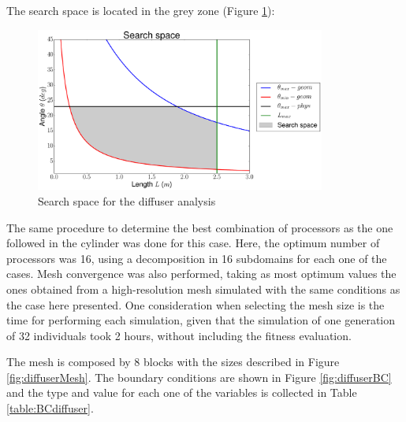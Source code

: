 The search space is located in the grey zone (Figure \ref{fig:searchSpace}):

     \begin{figure}[h!]
        \centering
        \includegraphics[width=0.85\textwidth]{Figures/3/SearchSpace.pdf}
        \caption{Search space for the diffuser analysis}
        \label{fig:searchSpace}
    \end{figure}

\newpage

The same procedure to determine the best combination of processors as the one followed in the cylinder was done for this case. Here, the optimum number of processors was 16, using a decomposition in 16 subdomains for each one of the cases. Mesh convergence was also performed, taking as most optimum values the ones obtained from a high-resolution mesh simulated with the same conditions as the case here presented. One consideration when selecting the mesh size is the time for performing each simulation, given that the simulation of one generation of 32 individuals took 2 hours, without including the fitness evaluation. 

The mesh is composed by 8 blocks with the sizes described in Figure \ref{fig:diffuserMesh}. The boundary conditions are shown in Figure \ref{fig:diffuserBC} and the type and value for each one of the variables is collected in Table \ref{table:BCdiffuser}. 

    \vspace{10mm}    
    
